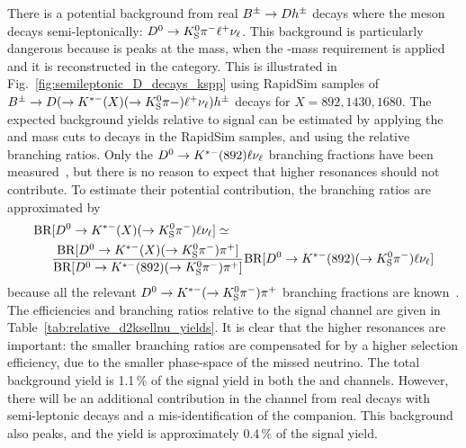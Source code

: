 There is a potential background from real ${{B}^\pm}\rightarrow{\ensuremath{D}} h^\pm$ decays where the \D meson decays semi-leptonically: ${{D}^0}\rightarrow{\ensuremath{{K}^0_{\mathrm{S}}}}{\ensuremath{{\pi}^-}}\ell^+\nu_\ell$. This background is particularly dangerous because is peaks at the \B mass, when the \D-mass requirement is applied and it is reconstructed in the \DtoKspipi category. This is illustrated in Fig.~\ref{fig:semileptonic_D_decays_kspp} using RapidSim samples of ${{B}^\pm}\rightarrow{\ensuremath{D}}(\rightarrow K^{*-}(X)(\rightarrow {\ensuremath{{K}^0_{\mathrm{S}}}}\pi-)\ell^+\nu_\ell)h^\pm $ decays for $X=892, 1430, 1680$. The expected background yields relative to signal can be estimated by applying the \B and \D mass cuts to decays in the RapidSim samples, and using the relative branching ratios. Only the ${{D}^0}\rightarrow{\ensuremath{{K}^{*-}}}(892)\ell\nu_\ell$ branching fractions have been measured~\cite{PDG2020}, but there is no reason to expect that higher \Kstar resonances should not contribute. To estimate their potential contribution, the branching ratios are approximated by
\begin{align*}
    \text{BR}&[{{D}^0}\rightarrow{\ensuremath{{K}^{*-}}}(X)(\rightarrow{\ensuremath{{K}^0_{\mathrm{S}}}}{\ensuremath{{\pi}^-}})\ell\nu_\ell] \simeq\\& \frac{\text{BR}[{{D}^0}\rightarrow{\ensuremath{{K}^{*-}}}(X)(\rightarrow{\ensuremath{{K}^0_{\mathrm{S}}}}{\ensuremath{{\pi}^-}}){{\pi}^+}] }{\text{BR}[{{D}^0}\rightarrow{\ensuremath{{K}^{*-}}}(892)(\rightarrow{\ensuremath{{K}^0_{\mathrm{S}}}}{\ensuremath{{\pi}^-}}){{\pi}^+}] }\text{BR}[{{D}^0}\rightarrow{\ensuremath{{K}^{*-}}}(892)(\rightarrow{\ensuremath{{K}^0_{\mathrm{S}}}}{\ensuremath{{\pi}^-}})\ell\nu_\ell] 
\end{align*}
because all the relevant ${{D}^0}\rightarrow{\ensuremath{{K}^{*-}}}(\rightarrow{\ensuremath{{K}^0_{\mathrm{S}}}}{\ensuremath{{\pi}^-}}){{\pi}^+}$ branching fractions are known~\cite{PDG2018
}. The efficiencies and branching ratios relative to the signal channel are given in Table~\ref{tab:relative_d2ksellnu_yields}. It is clear that the higher \Kstar resonances are important: the smaller branching ratios are compensated for by a higher selection efficiency, due to the smaller phase-space of the missed neutrino. The total background yield is 1.1\,\% of the signal yield in both the \BtoDpi and \BtoDK channels. However, there will be an additional contribution in the \BtoDK channel from real \BtoDpi decays with semi-leptonic \D decays and a mis-identification of the companion. This background also peaks, and the yield is approximately 0.4\,\% of the \BtoDK signal yield.

